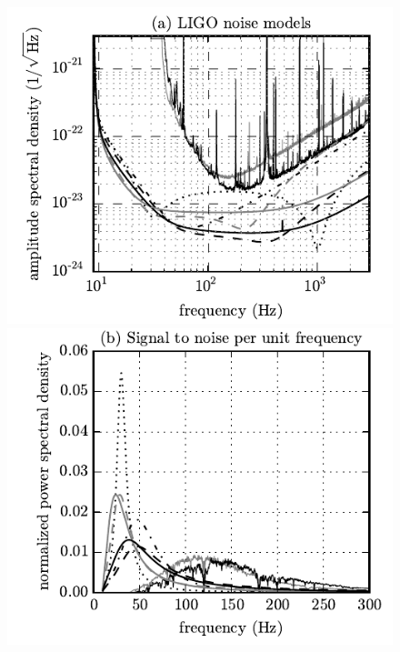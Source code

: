 \documentclass[preprint2]{aastex}
\begin{document}
\begin{figure}[b]
	\includegraphics{figures/asds}%
	\includegraphics{figures/weighted_asds}


\end{figure}
\end{document}
